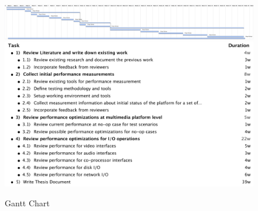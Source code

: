 \begin{figure}[tbh]
\centering
\includegraphics[width=0.55\textheight,height=0.34\textwidth,angle=90]{images/Gantt.pdf}\\
\includegraphics[width=0.4\textheight,angle=90]{images/Outline.pdf}
\caption{Gantt Chart}\label{gantt}
\end{figure}
